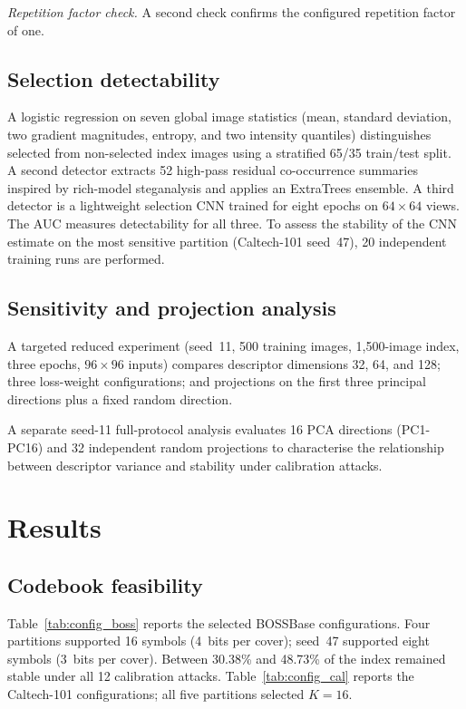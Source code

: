\documentclass[10pt,journal]{IEEEtran}
\begin{document}
\textit{Repetition factor check.} A second check confirms the
configured repetition factor of one.

\subsection{Selection detectability}
\label{subsec:detect_proto}

A logistic regression on seven global image statistics (mean, standard
deviation, two gradient magnitudes, entropy, and two intensity quantiles)
distinguishes selected from non-selected index images using a stratified
65/35 train/test split. A second detector extracts 52 high-pass residual
co-occurrence summaries inspired by rich-model steganalysis
\cite{fridrich2012rich} and applies an ExtraTrees ensemble. A third
detector is a lightweight selection CNN trained for eight epochs on
$64\times64$ views. The AUC measures detectability for all three. To
assess the stability of the CNN estimate on the most sensitive partition
(Caltech-101 seed~47), 20 independent training runs are performed.

\subsection{Sensitivity and projection analysis}
\label{subsec:sens_proto}

A targeted reduced experiment (seed~11, 500 training images, 1{,}500-image
index, three epochs, $96\times96$ inputs) compares descriptor dimensions
32, 64, and 128; three loss-weight configurations; and projections on
the first three principal directions plus a fixed random direction.

A separate seed-11 full-protocol analysis evaluates 16 PCA directions
(PC1-PC16) and 32 independent random projections to characterise the
relationship between descriptor variance and stability under
calibration attacks.

\section{Results}
\label{sec:results}

\subsection{Codebook feasibility}

Table~\ref{tab:config_boss} reports the selected BOSSBase configurations.
Four partitions supported 16 symbols (4~bits per cover); seed~47
supported eight symbols (3~bits per cover). Between 30.38\% and 48.73\%
of the index remained stable under all 12 calibration attacks.
Table~\ref{tab:config_cal} reports the Caltech-101 configurations; all
five partitions selected $K{=}16$.
\end{document}
